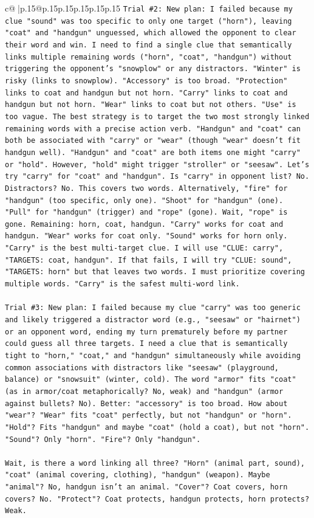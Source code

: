 \documentclass{article}
\begin{document}
{\begin{supertabular}{c@{$\;$}|p{.15\linewidth}@{}p{.15\linewidth}p{.15\linewidth}p{.15\linewidth}p{.15\linewidth}p{.15\linewidth}}
{{{\texttt{Trial \#2: New plan: I failed because my clue "sound" was too specific to only one target ("horn"), leaving "coat" and "handgun" unguessed, which allowed the opponent to clear their word and win. I need to find a single clue that semantically links multiple remaining words ("horn", "coat", "handgun") without triggering the opponent's "snowplow" or any distractors. "Winter" is risky (links to snowplow). "Accessory" is too broad. "Protection" links to coat and handgun but not horn. "Carry" links to coat and handgun but not horn. "Wear" links to coat but not others. "Use" is too vague. The best strategy is to target the two most strongly linked remaining words with a precise action verb. "Handgun" and "coat" can both be associated with "carry" or "wear" (though "wear" doesn't fit handgun well). "Handgun" and "coat" are both items one might "carry" or "hold". However, "hold" might trigger "stroller" or "seesaw". Let's try "carry" for "coat" and "handgun". Is "carry" in opponent list? No. Distractors? No. This covers two words. Alternatively, "fire" for "handgun" (too specific, only one). "Shoot" for "handgun" (one). "Pull" for "handgun" (trigger) and "rope" (gone). Wait, "rope" is gone. Remaining: horn, coat, handgun. "Carry" works for coat and handgun. "Wear" works for coat only. "Sound" works for horn only. "Carry" is the best multi{-}target clue. I will use "CLUE: carry", "TARGETS: coat, handgun". If that fails, I will try "CLUE: sound", "TARGETS: horn" but that leaves two words. I must prioritize covering multiple words. "Carry" is the safest multi{-}word link.} \\
\\ 
\texttt{Trial \#3: New plan: I failed because my clue "carry" was too generic and likely triggered a distractor word (e.g., "seesaw" or "hairnet") or an opponent word, ending my turn prematurely before my partner could guess all three targets. I need a clue that is semantically tight to "horn," "coat," and "handgun" simultaneously while avoiding common associations with distractors like "seesaw" (playground, balance) or "snowsuit" (winter, cold). The word "armor" fits "coat" (as in armor/coat metaphorically? No, weak) and "handgun" (armor against bullets? No). Better: "accessory" is too broad. How about "wear"? "Wear" fits "coat" perfectly, but not "handgun" or "horn". "Hold"? Fits "handgun" and maybe "coat" (hold a coat), but not "horn". "Sound"? Only "horn". "Fire"? Only "handgun". } \\
\\ 
\texttt{Wait, is there a word linking all three? "Horn" (animal part, sound), "coat" (animal covering, clothing), "handgun" (weapon). Maybe "animal"? No, handgun isn't an animal. "Cover"? Coat covers, horn covers? No. "Protect"? Coat protects, handgun protects, horn protects? Weak. } \\
}}}
\end{supertabular}}
\end{document}
